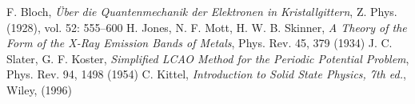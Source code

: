 \begin{thebibliography}{99}

 F. Bloch, \textit{Über die Quantenmechanik der Elektronen in Kristallgittern}, Z. Phys. (1928), vol. 52: 555–600
 H. Jones, N. F. Mott,  H. W. B. Skinner, \textit{A Theory of the Form of the X-Ray Emission Bands of Metals}, Phys. Rev. 45, 379 (1934)
 J. C. Slater, G. F. Koster, \textit{Simplified LCAO Method for the Periodic Potential Problem}, Phys. Rev. 94, 1498 (1954)
 C. Kittel, \textit{Introduction to Solid State Physics, 7th ed.}, Wiley, (1996) 
\end{thebibliography}
